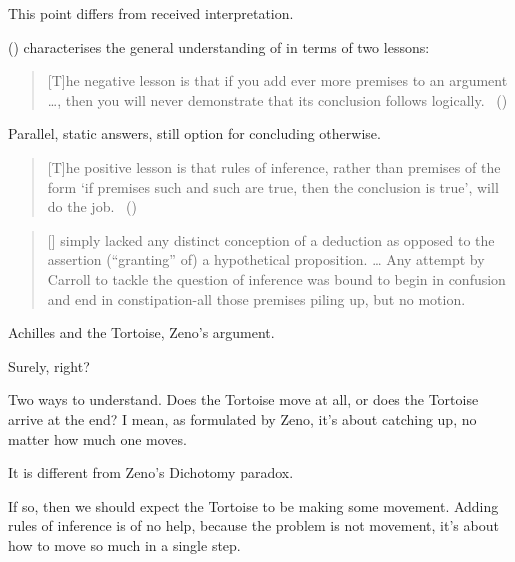 \begin{note}
  This point differs from received interpretation.

  \citeauthor{Wieland:2013vf} (\citeyear{Wieland:2013vf}) characterises the general understanding of \textcite{Carroll:1895uj} in terms of two lessons:
  \begin{quote}
    [T]he negative lesson is that if you add ever more premises to an argument \dots, then you will never demonstrate that its conclusion follows logically.\newline
    \mbox{ }\hfill\mbox{(\citeyear[984]{Wieland:2013vf})}
  \end{quote}

  Parallel, static answers, still option for concluding otherwise.

  \begin{quote}
    [T]he positive lesson is that rules of inference, rather than premises of the form `if premises such and such are true, then the conclusion is true', will do the job.\newline
    \mbox{ }\hfill\mbox{(\citeyear[984]{Wieland:2013vf})}
  \end{quote}

  \begin{quote}
    [\citeauthor{Carroll:1895uj}] simply lacked any distinct conception of a deduction as opposed to the assertion (``granting'' of) a hypothetical proposition.
    \dots
    Any attempt by Carroll to tackle the question of inference was bound to begin in confusion and end in constipation-all those premises piling up, but no motion.
  \end{quote}

  Achilles and the Tortoise, Zeno's argument.

  Surely, right?

  Two ways to understand.
  Does the Tortoise move at all, or does the Tortoise arrive at the end?
  I mean, as formulated by Zeno, it's about catching up, no matter how much one moves.

  It is different from Zeno's Dichotomy paradox.


  If so, then we should expect the Tortoise to be making some movement.
  Adding rules of inference is of no help, because the problem is not movement, it's about how to move so much in a single step.
\end{note}


